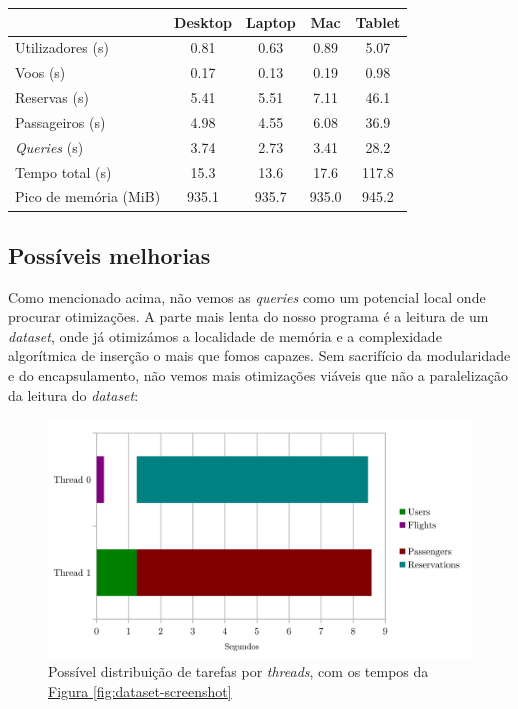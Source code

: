 \documentclass[11pt, a4paper]{article}
\begin{document}
\begin{center}
    \begin{tabular}{|l|c|c|c|c|}
        \hline
        & Desktop & Laptop & Mac & Tablet \\
        \hline
        Utilizadores (s) & 0.81 & 0.63 & 0.89 & 5.07 \\
        \hline
        Voos (s) & 0.17 & 0.13 & 0.19 & 0.98 \\
        \hline
        Reservas (s) & 5.41 & 5.51 & 7.11 & 46.1 \\
        \hline
        Passageiros (s) & 4.98 & 4.55 & 6.08 & 36.9 \\
        \hline
        \emph{Queries} (s) & 3.74 & 2.73 & 3.41 & 28.2 \\
        \hline
        Tempo total (s) & 15.3 & 13.6 & 17.6 & 117.8 \\
        \hline
        Pico de memória (MiB) & 935.1 & 935.7 & 935.0 & 945.2 \\
        \hline
    \end{tabular}
\end{center}


\subsection{Possíveis melhorias}
\label{sec:possible-performance-improvements}

Como mencionado acima, não vemos as \emph{queries} como um potencial local onde procurar
otimizações. A parte mais lenta do nosso programa é a leitura de um \emph{dataset}, onde já
otimizámos a localidade de memória e a complexidade algorítmica de inserção o mais que fomos
capazes. Sem sacrifício da modularidade e do encapsulamento, não vemos mais otimizações viáveis
que não a paralelização da leitura do \emph{dataset}:

\begin{figure}[h]
    \centering
    \includegraphics[scale=0.20]{res-fase2/threading.png}
    \caption{Possível distribuição de tarefas por \emph{threads}, com os tempos da
             \hyperref[fig:dataset-screenshot]{Figura \ref*{fig:dataset-screenshot}}}
    \label{fig:threading}
\end{figure}
\end{document}
